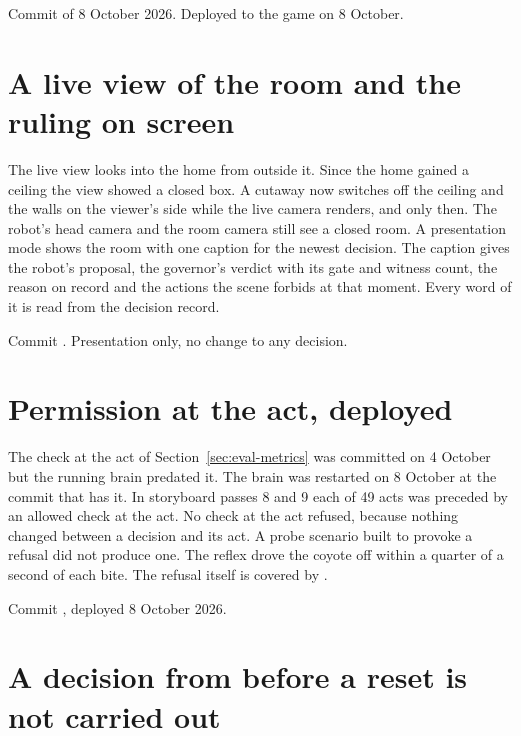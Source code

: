 Commit  of 8 October 2026.
Deployed to the game on 8 October.

\section{A live view of the room and the ruling on screen}\label{sec:log-view}

The live view looks into the home from outside it.
Since the home gained a ceiling the view showed a closed box.
A cutaway now switches off the ceiling and the walls on the viewer's side while the live camera
renders, and only then.
The robot's head camera and the room camera still see a closed room.
A presentation mode shows the room with one caption for the newest decision.
The caption gives the robot's proposal, the governor's verdict with its gate and witness count,
the reason on record and the actions the scene forbids at that moment.
Every word of it is read from the decision record.

Commit .
Presentation only, no change to any decision.

\section{Permission at the act, deployed}\label{sec:log-act}

The check at the act of Section~\ref{sec:eval-metrics} was committed on 4 October but the running
brain predated it.
The brain was restarted on 8 October at the commit that has it.
In storyboard passes 8 and 9 each of 49 acts was preceded by an allowed check at the act.
No check at the act refused, because nothing changed between a decision and its act.
A probe scenario built to provoke a refusal did not produce one.
The reflex drove the coyote off within a quarter of a second of each bite.
The refusal itself is covered by .

Commit , deployed 8 October 2026.

\section{A decision from before a reset is not carried out}\label{sec:log-epoch}

